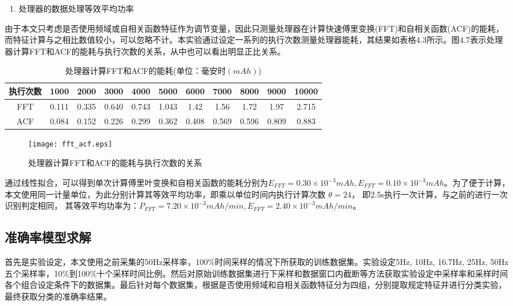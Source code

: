 \begin{enumerate}[(4)]
	\item 处理器的数据处理等效平均功率
\end{enumerate}
\par 由于本文只考虑是否使用频域或自相关函数特征作为调节变量，因此只测量处理器在计算快速傅里变换(FFT)和自相关函数(ACF)的能耗，而特征计算与之相比数值较小，可以忽略不计。本实验通过设定一系列的执行次数测量处理器能耗，其结果如表格4.3所示。图4.7表示处理器计算FFT和ACF的能耗与执行次数的关系，从中也可以看出明显正比关系。

\begin{table}[htb]
    \centering
    \caption{处理器计算FFT和ACF的能耗(单位：毫安时$(mAh)$)}
    \begin{tabular}{ccccccccccc}
    \toprule
    执行次数 & 1000 & 2000 & 3000 & 4000 & 5000 & 6000 & 7000 & 8000 & 9000 & 10000 \\
    \midrule
    FFT & 0.111 & 0.335 & 0.640 & 0.743 & 1.043 & 1.42 & 1.56 & 1.72 & 1.97 & 2.715 \\
    ACF & 0.084 & 0.152 & 0.226 & 0.299 & 0.362 & 0.408 & 0.569 & 0.596 & 0.809 & 0.883 \\
    \bottomrule
    \end{tabular}
 \end{table}

\begin{figure}[htb]
\centering
\texttt{[image: fft\_acf.eps]}
\caption{处理器计算FFT和ACF的能耗与执行次数的关系}
\end{figure}

通过线性拟合，可以得到单次计算傅里叶变换和自相关函数的能耗分别为$E_{FFT} = 0.30 \times 10^{-3} mAh, E_{FFT} = 0.10 \times 10^{-3} mAh$。为了便于计算，本文使用同一计量单位，为此分别计算其等效平均功率，即乘以单位时间内执行计算次数 $\theta = 24$， 即2.5s执行一次计算，与之前的进行一次识别判定相同， 其等效平均功率为：$P_{FFT} = 7.20 \times 10^{-3} mAh/min, E_{FFT} = 2.40 \times 10^{-3} mAh/min$。

\subsection{准确率模型求解}
\par 首先是实验设定，本文使用之前采集的50Hz采样率，100\%时间采样的情况下所获取的训练数据集。实验设定5Hz, 10Hz, 16.7Hz, 25Hz, 50Hz五个采样率，10\%到100\%十个采样时间比例。然后对原始训练数据集进行下采样和数据窗口内截断等方法获取实验设定中采样率和采样时间各个组合设定条件下的数据集。最后针对每个数据集，根据是否使用频域和自相关函数特征分为四组，分别提取规定特征并进行分类实验，最终获取分类的准确率结果。

